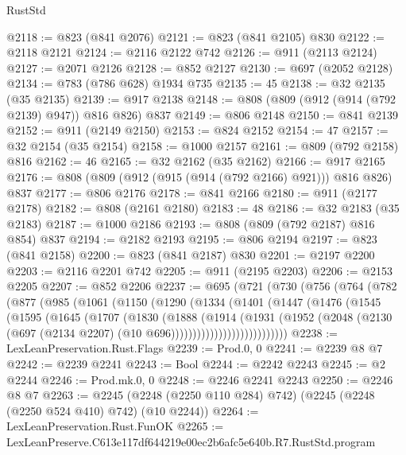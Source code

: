 \begin{lexlean}{RustStd}
\begin{coremodule}
@2118 := @823 (@841 @2076)
@2121 := @823 (@841 @2105) @830
@2122 := @2118 @2121
@2124 := @2116 @2122 @742
@2126 := @911 (@2113 @2124)
@2127 := @2071 @2126
@2128 := @852 @2127
@2130 := @697 (@2052 @2128)
@2134 := @783 (@786 @628) @1934 @735
@2135 := 45
@2138 := @32 @2135 (@35 @2135)
@2139 := @917 @2138
@2148 := @808 (@809 (@912 (@914 (@792 @2139) @947)) @816 @826) @837
@2149 := @806 @2148
@2150 := @841 @2139
@2152 := @911 (@2149 @2150)
@2153 := @824 @2152
@2154 := 47
@2157 := @32 @2154 (@35 @2154)
@2158 := @1000 @2157
@2161 := @809 (@792 @2158) @816
@2162 := 46
@2165 := @32 @2162 (@35 @2162)
@2166 := @917 @2165
@2176 := @808 (@809 (@912 (@915 (@914 (@792 @2166) @921))) @816 @826) @837
@2177 := @806 @2176
@2178 := @841 @2166
@2180 := @911 (@2177 @2178)
@2182 := @808 (@2161 @2180)
@2183 := 48
@2186 := @32 @2183 (@35 @2183)
@2187 := @1000 @2186
@2193 := @808 (@809 (@792 @2187) @816 @854) @837
@2194 := @2182 @2193
@2195 := @806 @2194
@2197 := @823 (@841 @2158)
@2200 := @823 (@841 @2187) @830
@2201 := @2197 @2200
@2203 := @2116 @2201 @742
@2205 := @911 (@2195 @2203)
@2206 := @2153 @2205
@2207 := @852 @2206
@2237 := @695
    (@721
      (@730
        (@756
          (@764
            (@782
              (@877
                (@985
                  (@1061
                    (@1150
                      (@1290
                        (@1334
                          (@1401
                            (@1447
                              (@1476
                                (@1545
                                  (@1595
                                    (@1645
                                      (@1707
                                        (@1830
                                          (@1888
                                            (@1914
                                              (@1931
                                                (@1952
                                                  (@2048
                                                    (@2130
                                                      (@697
                                                        (@2134 @2207)
                                                        (@10 @696)))))))))))))))))))))))))))
@2238 := LexLeanPreservation.Rust.Flags
@2239 := Prod.{0, 0}
@2241 := @2239 @8 @7
@2242 := @2239 @2241
@2243 := Bool
@2244 := @2242 @2243
@2245 := @2 @2244
@2246 := Prod.mk.{0, 0}
@2248 := @2246 @2241 @2243
@2250 := @2246 @8 @7
@2263 := @2245 (@2248 (@2250 @110 @284) @742) (@2245 (@2248 (@2250 @524 @410) @742) (@10 @2244))
@2264 := LexLeanPreservation.Rust.FunOK
@2265 := LexLeanPreserve.C613e117df644219e00ec2b6afc5e640b.R7.RustStd.program

\end{coremodule}
\end{lexlean}
